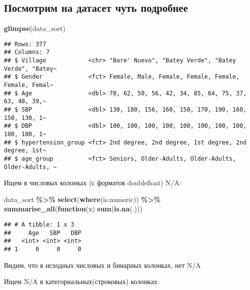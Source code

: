 \documentclass[
]{article}
\newenvironment{Shaded}{\begin{snugshade}}{\end{snugshade}}
\newcommand{\ControlFlowTok}[1]{\textcolor[rgb]{0.13,0.29,0.53}{\textbf{#1}}}
\newcommand{\FunctionTok}[1]{\textcolor[rgb]{0.13,0.29,0.53}{\textbf{#1}}}
\newcommand{\NormalTok}[1]{#1}
\newcommand{\SpecialCharTok}[1]{\textcolor[rgb]{0.81,0.36,0.00}{\textbf{#1}}}
\begin{document}
\subsection{Посмотрим на датасет чуть
подробнее}\label{ux43fux43eux441ux43cux43eux442ux440ux438ux43c-ux43dux430-ux434ux430ux442ux430ux441ux435ux442-ux447ux443ux442ux44c-ux43fux43eux434ux440ux43eux431ux43dux435ux435}

\begin{Shaded}
\begin{Highlighting}[]
\FunctionTok{glimpse}\NormalTok{(data\_sort)}
\end{Highlighting}
\end{Shaded}

\begin{verbatim}
## Rows: 377
## Columns: 7
## $ Village            <chr> "Bare' Nuevo", "Batey Verde", "Batey Verde", "Batey~
## $ Gender             <fct> Female, Male, Female, Female, Female, Female, Femal~
## $ Age                <dbl> 70, 62, 50, 56, 42, 34, 85, 64, 75, 37, 63, 48, 39,~
## $ SBP                <dbl> 130, 180, 156, 160, 150, 170, 190, 160, 150, 130, 1~
## $ DBP                <dbl> 100, 100, 100, 100, 100, 100, 100, 100, 100, 100, 1~
## $ hypertension_group <fct> 2nd degree, 2nd degree, 1st degree, 2nd degree, 1st~
## $ age_group          <fct> Seniors, Older-Adults, Older-Adults, Older-Adults, ~
\end{verbatim}

Ищем в числовых колонках (с форматов doublefloat) N/A:

\begin{Shaded}
\begin{Highlighting}[]
\NormalTok{data\_sort }\SpecialCharTok{\%\textgreater{}\%}
  \FunctionTok{select}\NormalTok{(}\FunctionTok{where}\NormalTok{(is.numeric)) }\SpecialCharTok{\%\textgreater{}\%}
  \FunctionTok{summarise\_all}\NormalTok{(}\ControlFlowTok{function}\NormalTok{(x) }\FunctionTok{sum}\NormalTok{(}\FunctionTok{is.na}\NormalTok{(.)))}
\end{Highlighting}
\end{Shaded}

\begin{verbatim}
## # A tibble: 1 x 3
##     Age   SBP   DBP
##   <int> <int> <int>
## 1     0     0     0
\end{verbatim}

Видим, что в исходных числовых и бинарных колонках, нет N/A

Ищем N/A в категориальных(строковых) колонках:
\end{document}
